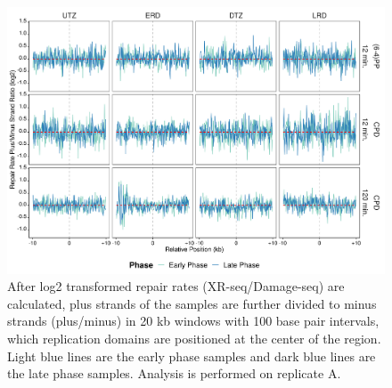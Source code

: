 \begin{figure}[H]
\begin{center}
\includegraphics[width=\textwidth]{Chapters/7_appendix/figures/supfig30}
\caption[Repair rate plus/minus phase ratio of replication domains in 20 kb (replicate A).]{After log2 transformed repair rates (XR-seq/Damage-seq) are calculated, plus strands of the samples are further divided to minus strands (plus/minus) in 20 kb windows with 100 base pair intervals, which replication domains are positioned at the center of the region. Light blue lines are the early phase samples and dark blue lines are the late phase samples. Analysis is performed on replicate A.}
\label{supfig:rrpm20repdomainA}
\end{center}
\end{figure}

